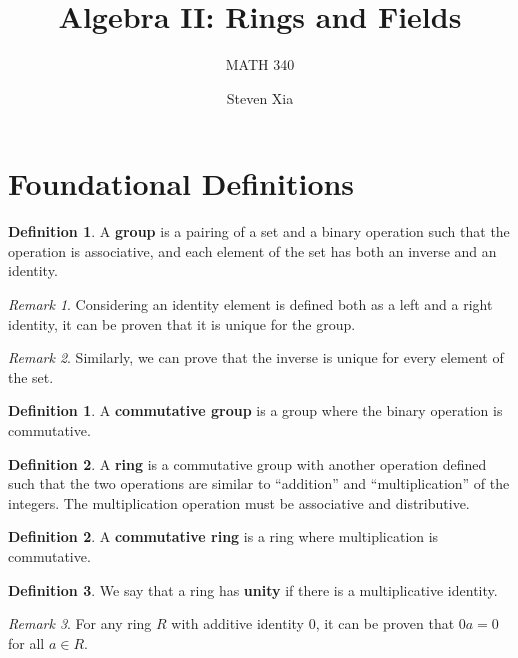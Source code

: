 \documentclass[parskip=half]{scrartcl}  %
\title{Algebra II: Rings and Fields}
\subtitle{MATH 340}
\author{Steven Xia}
\theoremstyle{definition}
\newtheorem{definition}{Definition}[section]
\newtheorem{subdefinition}{Definition}[definition]
\theoremstyle{plain}
\theoremstyle{remark}
\newtheorem{remark}{Remark}[definition]
\begin{document}
\maketitle


\section{Foundational Definitions}


\begin{definition}
    A \textbf{group} is a pairing of a set and a binary operation such that the
    operation is associative, and each element of the set has both an inverse
    and an identity.
\end{definition}

\begin{remark}
    Considering an identity element is defined both as a left and a right
    identity, it can be proven that it is unique for the group.
\end{remark}

\begin{remark}
    Similarly, we can prove that the inverse is unique for every element of the set.
\end{remark}

\begin{subdefinition}
    A \textbf{commutative group} is a group where the binary operation is
    commutative.
\end{subdefinition}

\begin{definition}
    A \textbf{ring} is a commutative group with another operation defined such
    that the two operations are similar to ``addition'' and ``multiplication''
    of the integers.
    The multiplication operation must be associative and distributive.
\end{definition}

\begin{subdefinition}
    A \textbf{commutative ring} is a ring where multiplication is commutative.
\end{subdefinition}

\begin{subdefinition}
    We say that a ring has \textbf{unity} if there is a multiplicative identity.
\end{subdefinition}

\begin{remark}
    \label{rem:zero multiply}
    For any ring $R$ with additive identity 0, it can be proven that $0a=0$ for
    all $a\in R$.
\end{remark}
\end{document}
